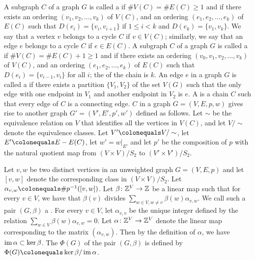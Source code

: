 A subgraph $C$ of a graph $G$ is called a {} if $\# V(C) = \# E(C) \geq 1$ and if there exists an ordering $(v_1,v_2,\ldots,v_k)$ of $V(C)$, and an ordering $(e_1,e_2,\ldots,e_k)$ of $E(C)$ such that $D(e_i) = \{v_i,v_{i+1} \}$ if $1 \leq i < k$ and $D(e_k) = \{v_1,v_k\}$. We say that a vertex $v$ belongs to a cycle $C$ if $v \in V(C)$; similarly, we say that an edge $e$ belongs to a cycle $C$ if $e \in E(C)$. A subgraph $C$ of a graph $G$ is called a {} if $\#V(C) = \#E(C)+1 \geq 1$ and if there exists an ordering $(v_0,v_1,v_2,\ldots,v_k)$ of $V(C)$, and an ordering $(e_1,e_2,\ldots,e_{k})$ of $E(C)$  such that $D(e_i) = \{v_{i-1},v_i\}$ for all $i$; the {} of the chain is $k$. An edge $e$ in a graph $G$ is called a {} if there exists a partition $\{V_1,V_2\}$ of the set $V(G)$ such that the only edge with one endpoint in $V_1$ and another endpoint in $V_2$ is $e$. A {} is a chain $C$ such that every edge of $C$ is a connecting edge. {} $C$ in a graph $G = (V,E,p,w)$ gives rise to another graph $G' = (V',E',p',w')$ defined as follows. Let $\sim$ be the equivalence relation on $V$ that identifies all the vertices in $V(C)$, and let $V/ \sim$ denote the equivalence classes. Let $V' \colonequals V/\sim$, let $E' \colonequals E \setminus E(C)$, let $w' = w|_{E'}$ and let $p'$ be the composition of $p$ with the natural quotient map from $(V \times V)/S_2$ to $(V' \times V')/S_2$.

Let $v,w$ be two distinct vertices in an unweighted graph $G = (V,E,p)$ and let $[v,w]$ denote the corresponding class in $(V \times V)/S_2$. Let $\alpha_{v,w} \colonequals \# p^{-1}([v,w])$. Let $\beta \colon \mathbb Z^{V} \rightarrow \mathbb Z$ be a linear map such that for every $v \in V$, we have that $\beta(v)$ divides $\sum_{w \in V, w \neq v} \beta(w) \alpha_{v,w}$. We call such a pair $(G,\beta)$ a {}. For every $v \in V$, let $\alpha_{v,v}$ be the unique integer defined by the relation $\sum_{w \in V} \beta(w) \alpha_{v,w} = 0$. Let $\alpha \colon \mathbb Z^V \rightarrow \mathbb Z^V$ denote the linear map corresponding to the matrix $(\alpha_{v,w})$. Then by the definition of $\alpha$, we have $\operatorname{im} \alpha \subset \ker \beta$. The {} $\Phi(G)$ of the pair $(G,\beta)$ is defined by $\Phi(G) \colonequals \ker \beta/\im \alpha$. 

